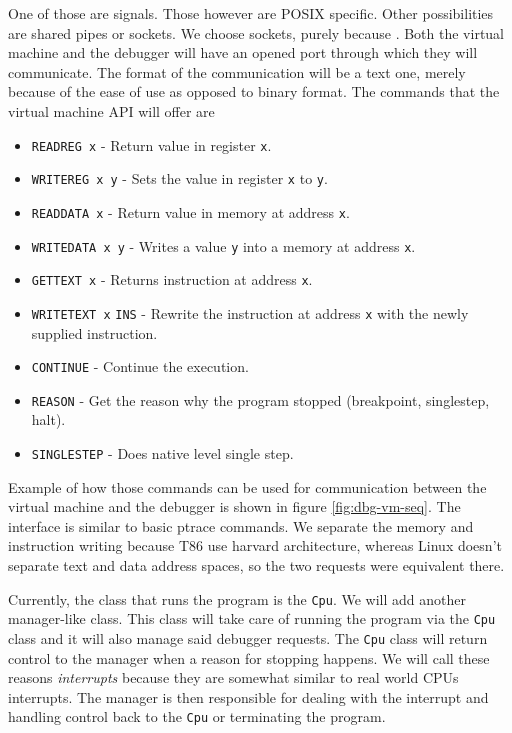 One of those are signals. Those however are POSIX specific. Other possibilities
are shared pipes or sockets. We choose sockets, purely because . Both the virtual machine and the debugger
will have an opened port through which they will communicate. The format
of the communication will be a text one, merely because of the ease of use
as opposed to binary format. The commands that the virtual machine API
will offer are
\begin{itemize}
    \item \texttt{READREG x} - Return value in register \texttt{x}.
    \item \texttt{WRITEREG x y} - Sets the value in register \texttt{x} to \texttt{y}.
    \item \texttt{READDATA x} - Return value in memory at address \texttt{x}.
    \item \texttt{WRITEDATA x y} - Writes a value \texttt{y} into a memory at address \texttt{x}.
    \item \texttt{GETTEXT x} - Returns instruction at address \texttt{x}.
    \item \texttt{WRITETEXT x} \texttt{INS} - Rewrite the instruction at address
        \texttt{x} with the newly supplied instruction.
    \item \texttt{CONTINUE} - Continue the execution.
    \item \texttt{REASON} - Get the reason why the program stopped (breakpoint, singlestep, halt).
    \item \texttt{SINGLESTEP} - Does native level single step.
\end{itemize}
Example of how those commands can be used for communication between the virtual
machine and the debugger is shown in figure \ref{fig:dbg-vm-seq}. The interface
is similar to basic ptrace commands. We separate the memory and instruction
writing because T86 use harvard architecture, whereas Linux doesn't separate
text and data address spaces, so the two requests were equivalent there.

Currently, the class that runs the program is the \texttt{Cpu}. We will add
another manager-like class. This class will take care of running the program
via the \texttt{Cpu} class and it will also manage said debugger requests. The
\texttt{Cpu} class will return control to the manager when a reason for
stopping happens. We will call these reasons \textit{interrupts} because they
are somewhat similar to real world CPUs interrupts. The manager is then
responsible for dealing with the interrupt and handling control back to the
\texttt{Cpu} or terminating the program.

